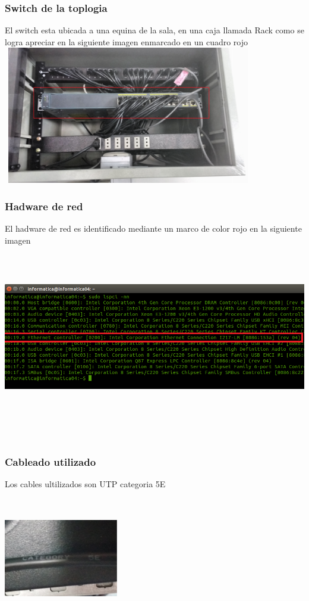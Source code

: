 \documentclass{article}
\begin{document}
\subsubsection{Switch de la toplogia}
El switch esta ubicada a una equina de la sala, en una caja llamada Rack como se logra apreciar en la siguiente imagen enmarcado en un cuadro rojo\\
\includegraphics[width=11cm, height=6cm]{switch.jpg}
\subsubsection{Hadware de red}
El hadware de red es identificado mediante un marco de color rojo en la siguiente imagen\\ \\ 
\includegraphics[width=16cm, height=7cm]{Tar_de_Red.png} \\ \\ \\
\subsubsection{Cableado utilizado}
Los cables ultilizados son UTP categoria 5E\\ \\
\includegraphics[width=5cm, height=5cm]{Cat_5E.png}
\end{document}
